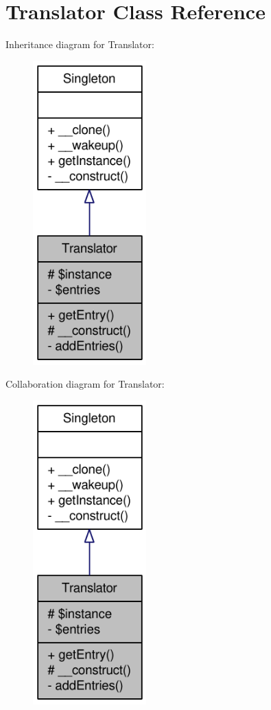 \hypertarget{classTranslator}{
\section{Translator Class Reference}
\label{classTranslator}
}


Inheritance diagram for Translator:\nopagebreak
\begin{figure}[H]
\begin{center}
\leavevmode
\includegraphics[width=124pt]{classTranslator__inherit__graph}
\end{center}
\end{figure}


Collaboration diagram for Translator:\nopagebreak
\begin{figure}[H]
\begin{center}
\leavevmode
\includegraphics[width=124pt]{classTranslator__coll__graph}
\end{center}
\end{figure}
